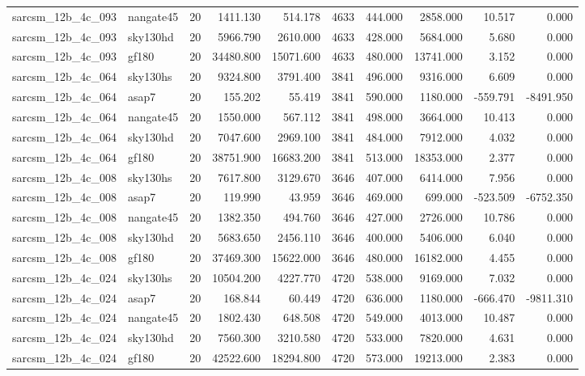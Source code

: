 \begin{longtable}{llrrrrrrrr}
sarcsm\_12b\_4c\_093 & nangate45 & 20 & 1411.130 & 514.178 & 4633 & 444.000 & 2858.000 & 10.517 & 0.000 \\
sarcsm\_12b\_4c\_093 & sky130hd & 20 & 5966.790 & 2610.000 & 4633 & 428.000 & 5684.000 & 5.680 & 0.000 \\
sarcsm\_12b\_4c\_093 & gf180 & 20 & 34480.800 & 15071.600 & 4633 & 480.000 & 13741.000 & 3.152 & 0.000 \\
sarcsm\_12b\_4c\_064 & sky130hs & 20 & 9324.800 & 3791.400 & 3841 & 496.000 & 9316.000 & 6.609 & 0.000 \\
sarcsm\_12b\_4c\_064 & asap7 & 20 & 155.202 & 55.419 & 3841 & 590.000 & 1180.000 & -559.791 & -8491.950 \\
sarcsm\_12b\_4c\_064 & nangate45 & 20 & 1550.000 & 567.112 & 3841 & 498.000 & 3664.000 & 10.413 & 0.000 \\
sarcsm\_12b\_4c\_064 & sky130hd & 20 & 7047.600 & 2969.100 & 3841 & 484.000 & 7912.000 & 4.032 & 0.000 \\
sarcsm\_12b\_4c\_064 & gf180 & 20 & 38751.900 & 16683.200 & 3841 & 513.000 & 18353.000 & 2.377 & 0.000 \\
sarcsm\_12b\_4c\_008 & sky130hs & 20 & 7617.800 & 3129.670 & 3646 & 407.000 & 6414.000 & 7.956 & 0.000 \\
sarcsm\_12b\_4c\_008 & asap7 & 20 & 119.990 & 43.959 & 3646 & 469.000 & 699.000 & -523.509 & -6752.350 \\
sarcsm\_12b\_4c\_008 & nangate45 & 20 & 1382.350 & 494.760 & 3646 & 427.000 & 2726.000 & 10.786 & 0.000 \\
sarcsm\_12b\_4c\_008 & sky130hd & 20 & 5683.650 & 2456.110 & 3646 & 400.000 & 5406.000 & 6.040 & 0.000 \\
sarcsm\_12b\_4c\_008 & gf180 & 20 & 37469.300 & 15622.000 & 3646 & 480.000 & 16182.000 & 4.455 & 0.000 \\
sarcsm\_12b\_4c\_024 & sky130hs & 20 & 10504.200 & 4227.770 & 4720 & 538.000 & 9169.000 & 7.032 & 0.000 \\
sarcsm\_12b\_4c\_024 & asap7 & 20 & 168.844 & 60.449 & 4720 & 636.000 & 1180.000 & -666.470 & -9811.310 \\
sarcsm\_12b\_4c\_024 & nangate45 & 20 & 1802.430 & 648.508 & 4720 & 549.000 & 4013.000 & 10.487 & 0.000 \\
sarcsm\_12b\_4c\_024 & sky130hd & 20 & 7560.300 & 3210.580 & 4720 & 533.000 & 7820.000 & 4.631 & 0.000 \\
sarcsm\_12b\_4c\_024 & gf180 & 20 & 42522.600 & 18294.800 & 4720 & 573.000 & 19213.000 & 2.383 & 0.000 \\

\end{longtable}
